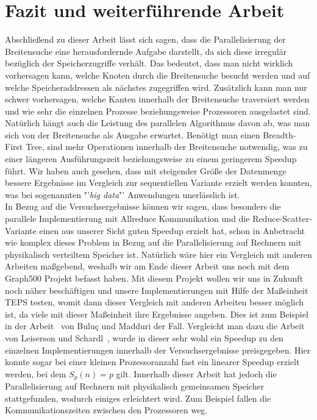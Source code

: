 \documentclass[11pt,a4paper]{article}
\begin{document}
\section{Fazit und weiterführende Arbeit}
\label{sec:fazit}
Abschließend zu dieser Arbeit lässt sich sagen, dass die Parallelisierung der Breitensuche eine herausfordernde Aufgabe darstellt, da sich diese irregulär bezüglich der Speicherzugriffe verhält. Das bedeutet, dass man nicht wirklich vorhersagen kann, welche Knoten durch die Breitensuche besucht werden und auf welche Speicheraddressen als nächstes zugegriffen wird. Zusätzlich kann man nur schwer vorhersagen, welche Kanten innerhalb der Breitensuche traversiert werden und wie sehr die einzelnen Prozesse beziehungsweise Prozessoren ausgelastet sind. Natürlich hängt auch die Leistung des parallelen Algorithmus davon ab, was man sich von der Breitensuche als Ausgabe erwartet. Benötigt man einen Breadth-First Tree, sind mehr Operationen innerhalb der Breitensuche notwendig, was zu einer längeren Ausführungszeit beziehungsweise zu einem geringerem Speedup führt. Wir haben auch gesehen, dass mit steigender Größe der Datenmenge bessere Ergebnisse im Vergleich zur sequentiellen Variante erzielt werden konnten, was bei sogenannten "'\textit{big data}"' Anwendungen unerlässlich ist.\\
In Bezug auf die Versuchsergebnisse können wir sagen, dass besonders die parallele Implementierung mit Allreduce Kommunikation und die Reduce-Scatter-Variante einen aus unserer Sicht guten Speedup erzielt hat, schon in Anbetracht wie komplex dieses Problem in Bezug auf die Parallelisierung auf Rechnern mit physikalisch verteiltem Speicher ist. Natürlich wäre hier ein Vergleich mit anderen Arbeiten maßgebend, weshalb wir am Ende dieser Arbeit uns noch mit dem Graph500 Projekt befasst haben. Mit diesem Projekt wollen wir uns in Zukunft noch näher beschäftigen und unsere Implementierungen mit Hilfe der Maßeinheit TEPS testen, womit dann dieser Vergleich mit anderen Arbeiten besser möglich ist, da viele mit dieser Maßeinheit ihre Ergebnisse angeben. Dies ist zum Beispiel in der Arbeit~\cite{buluc} von Buluç und Madduri der Fall. Vergleicht man dazu die Arbeit von Leiserson und Schardl~\cite{leiserson}, wurde in dieser sehr wohl ein Speedup zu den einzelnen Implementierungen innerhalb der Versuchsergebnisse preisgegeben. Hier konnte sogar bei einer kleinen Prozessoranzahl fast ein linearer Speedup erzielt werden, bei dem \(S_{p}(n) = p\) gilt. Innerhalb dieser Arbeit hat jedoch die Parallelisierung auf Rechnern mit physikalisch gemeinsamen Speicher stattgefunden, wodurch einiges erleichtert wird. Zum Beispiel fallen die Kommunikationszeiten zwischen den Prozessoren weg.\\
\end{document}
